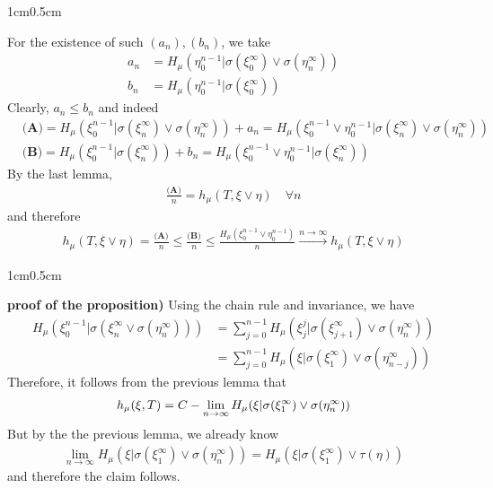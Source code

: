 \documentclass[12pt,a4paper]{report}
\newenvironment{proof}
{\begin{changemargin}{1cm}{0.5cm} 
	}%
	{\end{changemargin}
}
\begin{document}
\begin{proof}
For the existence of such $(a_n),(b_n)$, we take
\begin{align*}
a_n &= H_{\mu} (\eta_0^{n-1} | \sigma(\xi_0^{\infty}) \vee \sigma(\eta_n^{\infty})) \\
b_n &= H_{\mu} (\eta_0^{n-1} | \sigma(\xi_0^{\infty}) )
\end{align*}
Clearly, $a_n \leq b_n$ and indeed
\begin{align*}
& \textbf{(A)} = H_{\mu}(\xi_0^{n-1} | \sigma(\xi_n^{\infty}) \vee \sigma(\eta_n^{\infty})) + a_n = H_{\mu}(\xi_0^{n-1} \vee \eta_0^{n-1} | \sigma (\xi_n^{\infty}) \vee \sigma(\eta_n^{\infty})) \\
& \textbf{(B)} = H_{\mu}(\xi_0^{n-1} | \sigma(\xi_n^{\infty})) + b_n = H_{\mu}(\xi_0^{n-1} \vee \eta_0^{n-1} | \sigma (\xi_n^{\infty}))
\end{align*}
By the last lemma,
\begin{align*}
\frac{\textbf{(A)}}{n} = h_{\mu}(T, \xi \vee \eta) \quad \forall n
\end{align*}
and therefore
\begin{align*}
h_{\mu}(T, \xi\vee \eta) = \frac{\textbf{(A)}}{n} \leq \frac{\textbf{(B)}}{n} \leq \frac{H_{\mu}(\xi_0^{n-1} \vee \eta_{0}^{n-1})}{n} \xrightarrow{n\rightarrow \infty} h_{\mu}(T, \xi\vee \eta)
\end{align*}

\eop
\end{proof}
\s

\begin{proof}
\textbf{proof of the proposition)} Using the chain rule and invariance, we have
\begin{align*}
H_{\mu}(\xi_0^{n-1} | \sigma(\xi_n^{\infty} \vee \sigma(\eta_n^{\infty}))) &= \sum_{j=0}^{n-1} H_{\mu}(\xi_j^j | \sigma(\xi_{j+1}^{\infty}) \vee \sigma(\eta_{n}^{\infty})) \\
&= \sum_{j=0}^{n-1} H_{\mu}(\xi | \sigma(\xi_1^{\infty}) \vee \sigma(\eta_{n-j}^{\infty}))
\end{align*}
Therefore, it follows from the previous lemma that
\begin{align*}
h_{\mu}(\xi, T) = C-\lim_{n\rightarrow \infty} H_{\mu}(\xi | \sigma(\xi_1^{\infty}) \vee \sigma(\eta_n^{\infty}))
\end{align*}
But by the the previous lemma, we already know
\begin{align*}
\lim_{n\rightarrow \infty} H_{\mu}(\xi | \sigma(\xi_1^{\infty})\vee \sigma(\eta_n^{\infty})) = H_{\mu}(\xi | \sigma(\xi_1^{\infty})\vee \tau(\eta))
\end{align*}
and therefore the claim follows.

\eop
\end{proof}
\end{document}
